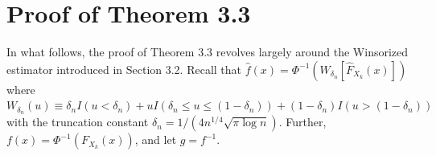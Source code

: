 \section{Proof of Theorem 3.3
}\label{proof_concentration2}


In what follows, the proof of Theorem 3.3
revolves largely around the Winsorized estimator introduced in Section 3.2. %
Recall that $\hat{f}(x) = \Phi^{-1}(W_{\delta_n}[\hat{F}_{X_k}(x)])$ where $W_{\delta_n}(u) \equiv \delta_n I(u < \delta_n) + u I(\delta_n \leq u \leq (1-\delta_n)) + (1-\delta_n) I(u > (1-\delta_n))$ with the truncation constant $\delta_n = 1/(4n^{1/4}\sqrt{\pi\log n})$. Further, $f(x) = \Phi^{-1}(F_{X_k}(x))$, and let $g = f^{-1}$.
    

